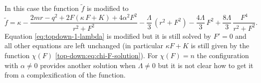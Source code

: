 In this case the function $\tilde f$ is modified to
\begin{equation}
	\tilde f = \kappa - \frac{2m r - q^2 + 2 F (\kappa\, F + K) + 4 \alpha^2 F^2}{r^2 + F^2} - \frac{\Lambda}{3}\, (r^2 + F^2) - \frac{4 \Lambda}{3}\, F^2 + \frac{8 \Lambda}{3}\, \frac{F^4}{r^2 + F^2}.
\end{equation} 
Equation \eqref{eq:topdown-1-lambda} is modified but it is still solved by $F' = 0$ and all other equations are left unchanged (in particular $\kappa F + K$ is still given by the function $\chi(F)$ \eqref{top-down:eq:chi-F-solution}).
For $\chi(F) = n$ the configuration with $\alpha \neq 0$ provides another solution when $\Lambda \neq 0$ but it is not clear how to get it from a complexification of the function.





